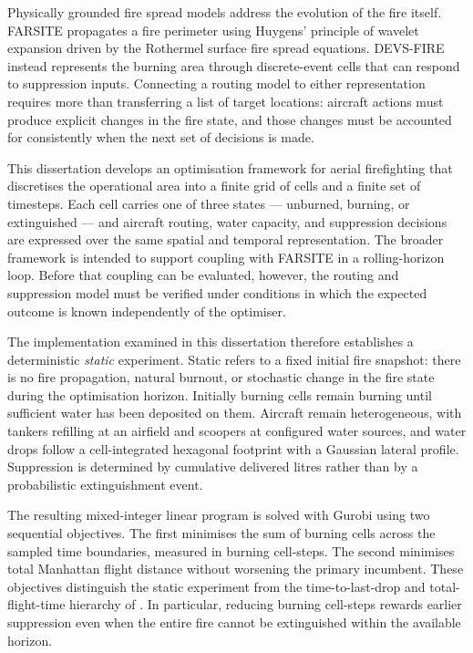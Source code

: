 Physically grounded fire spread models address the evolution of the fire itself. FARSITE \cite{finney1998farsite} propagates a fire perimeter using Huygens' principle of wavelet expansion driven by the Rothermel surface fire spread equations. DEVS-FIRE \cite{hu2012devsfire} instead represents the burning area through discrete-event cells that can respond to suppression inputs. Connecting a routing model to either representation requires more than transferring a list of target locations: aircraft actions must produce explicit changes in the fire state, and those changes must be accounted for consistently when the next set of decisions is made.

This dissertation develops an optimisation framework for aerial firefighting that discretises the operational area into a finite grid of cells and a finite set of timesteps. Each cell carries one of three states --- unburned, burning, or extinguished --- and aircraft routing, water capacity, and suppression decisions are expressed over the same spatial and temporal representation. The broader framework is intended to support coupling with FARSITE in a rolling-horizon loop. Before that coupling can be evaluated, however, the routing and suppression model must be verified under conditions in which the expected outcome is known independently of the optimiser.

The implementation examined in this dissertation therefore establishes a deterministic \emph{static} experiment. Static refers to a fixed initial fire snapshot: there is no fire propagation, natural burnout, or stochastic change in the fire state during the optimisation horizon. Initially burning cells remain burning until sufficient water has been deposited on them. Aircraft remain heterogeneous, with tankers refilling at an airfield and scoopers at configured water sources, and water drops follow a cell-integrated hexagonal footprint with a Gaussian lateral profile. Suppression is determined by cumulative delivered litres rather than by a probabilistic extinguishment event.

The resulting mixed-integer linear program is solved with Gurobi using two sequential objectives. The first minimises the sum of burning cells across the sampled time boundaries, measured in burning cell-steps. The second minimises total Manhattan flight distance without worsening the primary incumbent. These objectives distinguish the static experiment from the time-to-last-drop and total-flight-time hierarchy of \citet{chalabi2024affvrp}. In particular, reducing burning cell-steps rewards earlier suppression even when the entire fire cannot be extinguished within the available horizon.

